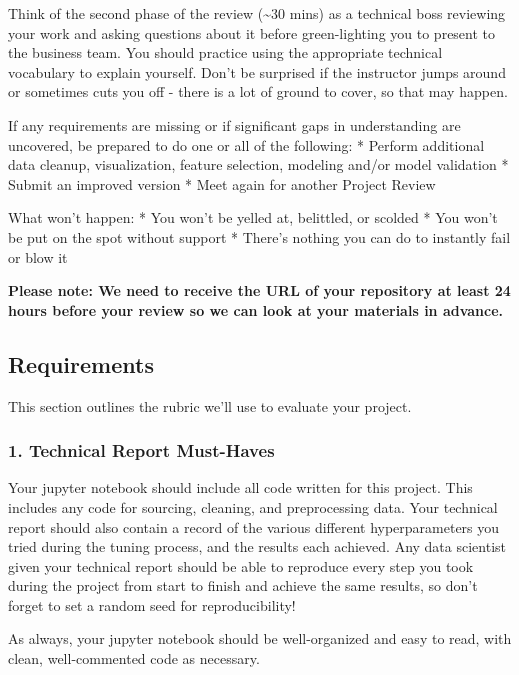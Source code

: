 \documentclass[11pt]{article}
\begin{document}
Think of the second phase of the review (\textasciitilde{}30 mins) as a
technical boss reviewing your work and asking questions about it before
green-lighting you to present to the business team. You should practice
using the appropriate technical vocabulary to explain yourself. Don't be
surprised if the instructor jumps around or sometimes cuts you off -
there is a lot of ground to cover, so that may happen.

If any requirements are missing or if significant gaps in understanding
are uncovered, be prepared to do one or all of the following: * Perform
additional data cleanup, visualization, feature selection, modeling
and/or model validation * Submit an improved version * Meet again for
another Project Review

What won't happen: * You won't be yelled at, belittled, or scolded * You
won't be put on the spot without support * There's nothing you can do to
instantly fail or blow it

\textbf{Please note: We need to receive the URL of your repository at
least 24 hours before your review so we can look at your materials in
advance.}

    \hypertarget{requirements}{%
\subsection{Requirements}\label{requirements}}

This section outlines the rubric we'll use to evaluate your project.

\hypertarget{technical-report-must-haves}{%
\subsubsection{1. Technical Report
Must-Haves}\label{technical-report-must-haves}}

Your jupyter notebook should include all code written for this project.
This includes any code for sourcing, cleaning, and preprocessing data.
Your technical report should also contain a record of the various
different hyperparameters you tried during the tuning process, and the
results each achieved. Any data scientist given your technical report
should be able to reproduce every step you took during the project from
start to finish and achieve the same results, so don't forget to set a
random seed for reproducibility!

As always, your jupyter notebook should be well-organized and easy to
read, with clean, well-commented code as necessary.
\end{document}
